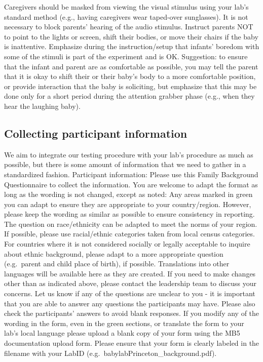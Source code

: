 \documentclass[
]{book}
\begin{document}
Caregivers should be masked from viewing the visual stimulus using your lab's standard method (e.g., having caregivers wear taped-over sunglasses).
It is not necessary to block parents' hearing of the audio stimulus.
Instruct parents NOT to point to the lights or screen, shift their bodies, or move their chairs if the baby is inattentive. Emphasize during the instruction/setup that infants' boredom with some of the stimuli is part of the experiment and is OK.
Suggestion: to ensure that the infant and parent are as comfortable as possible, you may tell the parent that it is okay to shift their or their baby's body to a more comfortable position, or provide interaction that the baby is soliciting, but emphasize that this may be done only for a short period during the attention grabber phase (e.g., when they hear the laughing baby).

\subsection{Collecting participant information}\label{collecting-participant-information}

We aim to integrate our testing procedure with your lab's procedure as much as possible, but there is some amount of information that we need to gather in a standardized fashion.
Participant information: Please use this Family Background Questionnaire to collect the information. You are welcome to adapt the format as long as the wording is not changed, except as noted:
Any areas marked in green you can adapt to ensure they are appropriate to your country/region. However, please keep the wording as similar as possible to ensure consistency in reporting.
The question on race/ethnicity can be adapted to meet the norms of your region. If possible, please use racial/ethnic categories taken from local census categories. For countries where it is not considered socially or legally acceptable to inquire about ethnic background, please adapt to a more appropriate question (e.g.~parent and child place of birth), if possible.
Translations into other languages will be available here as they are created.
If you need to make changes other than as indicated above, please contact the leadership team to discuss your concerns.
Let us know if any of the questions are unclear to you - it is important that you are able to answer any questions the participants may have. Please also check the participants' answers to avoid blank responses.
If you modify any of the wording in the form, even in the green sections, or translate the form to your lab's local language please upload a blank copy of your form using the MB5 documentation upload form. Please ensure that your form is clearly labeled in the filename with your LabID (e.g.~babylabPrinceton\_background.pdf).
\end{document}
